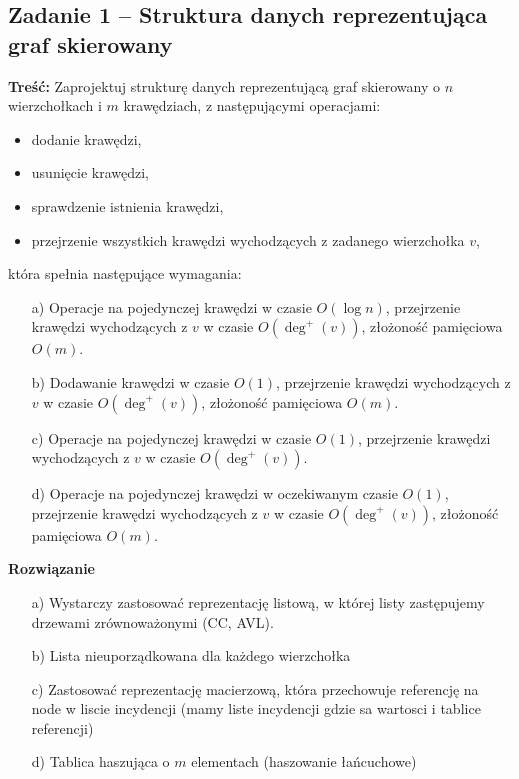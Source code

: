 \subsection{Zadanie 1 -- Struktura danych reprezentująca graf skierowany}

\textbf{Treść:} Zaprojektuj strukturę danych reprezentującą graf skierowany o $n$ wierzchołkach i $m$ krawędziach, z
następującymi operacjami:
\begin{itemize}
	\item dodanie krawędzi,
	\item usunięcie krawędzi,
	\item sprawdzenie istnienia krawędzi,
	\item przejrzenie wszystkich krawędzi wychodzących z zadanego wierzchołka $v$,
\end{itemize}
która spełnia następujące wymagania:
\begin{itemize}
	\item[a)] Operacje na pojedynczej krawędzi w czasie $O(\log n)$, przejrzenie krawędzi wychodzących z $v$ w czasie $O(\deg^+(v))$, 
	złożoność pamięciowa $O(m)$.
	\item[b)] Dodawanie krawędzi w czasie $O(1)$, przejrzenie krawędzi wychodzących z $v$ w czasie $O(\deg^+(v))$, złożoność
	pamięciowa $O(m)$.
	\item[c)] Operacje na pojedynczej krawędzi w czasie $O(1)$, przejrzenie krawędzi wychodzących z $v$ w czasie $O(\deg^+(v))$.
	\item[d)] Operacje na pojedynczej krawędzi w oczekiwanym czasie $O(1)$, przejrzenie krawędzi wychodzących z $v$ w czasie
	$O(\deg^+(v))$, złożoność pamięciowa $O(m)$.
\end{itemize}

\textbf{Rozwiązanie}
\begin{itemize}
	\item[a)] Wystarczy zastosować reprezentację listową, w której 
	listy zastępujemy drzewami zrównoważonymi (CC, AVL).
	\item[b)] Lista nieuporządkowana dla każdego wierzchołka
	\item[c)] Zastosować reprezentację macierzową, która przechowuje
	referencję na node w liscie incydencji (mamy liste incydencji
	gdzie sa wartosci i tablice referencji)
	\item[d)] Tablica haszująca o $m$ elementach (haszowanie łańcuchowe)
\end{itemize}

